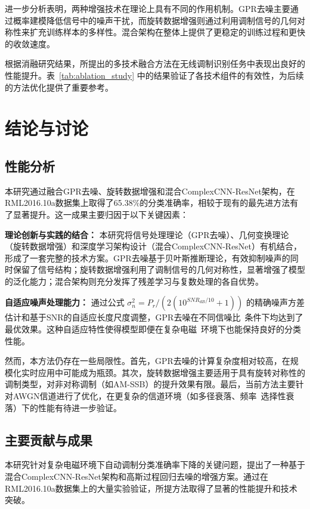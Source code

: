 \documentclass[conference]{IEEEtran}
\begin{document}
进一步分析表明，两种增强技术在理论上具有不同的作用机制。GPR去噪主要通过概率建模降低信号中的噪声干扰，而旋转数据增强则通过利用调制信号的几何对称性来扩充训练样本的多样性。混合架构在整体上提供了更稳定的训练过程和更快的收敛速度。

根据消融研究结果，所提出的多技术融合方法在无线调制识别任务中表现出良好的性能提升。表~\ref{tab:ablation_study} 中的结果验证了各技术组件的有效性，为后续的方法优化提供了重要参考。


\section{结论与讨论}

\subsection{性能分析}

本研究通过融合GPR去噪、旋转数据增强和混合ComplexCNN-ResNet架构，在RML2016.10a数据集上取得了65.38\%的分类准确率，相较于现有的最先进方法有了显著提升。这一成果主要归因于以下关键因素：

\textbf{理论创新与实践的结合：} 本研究将信号处理理论（GPR去噪）、几何变换理论（旋转数据增强）和深度学习架构设计（混合ComplexCNN-ResNet）有机结合，形成了一套完整的技术方案。GPR去噪基于贝叶斯推断理论，有效抑制噪声的同时保留了信号结构；旋转数据增强利用了调制信号的几何对称性，显著增强了模型的泛化能力；混合架构则充分发挥了残差学习与复数处理的各自优势。

\textbf{自适应噪声处理能力：} 通过公式 $\sigma_n^2 = P_r/(2(10^{SNR_{dB}/10} + 1))$ 的精确噪声方差估计和基于SNR的自适应长度尺度调整，GPR去噪在不同信噪比~条件下均达到了最优效果。这种自适应特性使得模型即便在复杂电磁~环境下也能保持良好的分类性能。

然而，本方法仍存在一些局限性。首先，GPR去噪的计算复杂度相对较高，在规模化实时应用中可能成为瓶颈。其次，旋转数据增强主要适用于具有旋转对称性的调制类型，对非对称调制（如AM-SSB）的提升效果有限。最后，当前方法主要针对AWGN信道进行了优化，在更复杂的信道环境（如多径衰落、频率~选择性衰落）下的性能有待进一步验证。

\subsection{主要贡献与成果}

本研究针对复杂电磁环境下自动调制分类准确率下降的关键问题，提出了一种基于混合ComplexCNN-ResNet架构和高斯过程回归去噪的增强方案。通过在RML2016.10a数据集上的大量实验验证，所提方法取得了显著的性能提升和技术突破。
\end{document}
